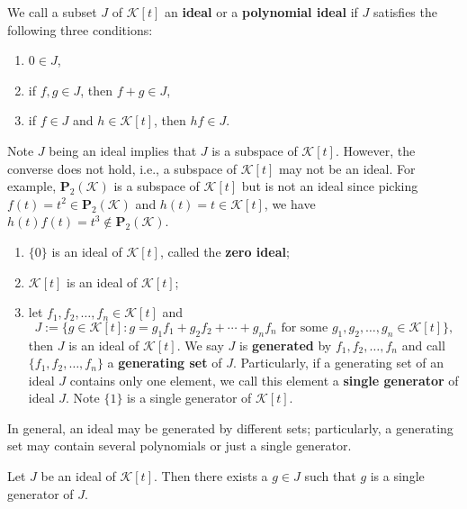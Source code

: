 \begin{definitionenv}
    We call a subset $J$ of $\mathcal K[t]$ an \textbf{ideal} or a \textbf{polynomial ideal} if $J$ satisfies the following three conditions:
    \begin{enumerate}[label=(\arabic*)]
        \item $0 \in J$,
        \item if $f,g \in J$, then $f+g \in J$,
        \item if $f\in J$ and $h\in \mathcal K[t]$, then $hf \in J$.
    \end{enumerate}
\end{definitionenv}
\begin{remarkenv}
    Note $J$ being an ideal implies that $J$ is a subspace of $\mathcal K[t]$. However, the converse does not hold, i.e., a subspace of $\mathcal K[t]$ may not be an ideal. For example, $\mathbf{P}_2(\mathcal K)$ is a subspace of $\mathcal K[t]$ but is not an ideal since picking $f(t) = t^2 \in \mathbf{P}_2(\mathcal K)$ and $h(t) = t \in \mathcal K[t]$, we have $h(t) f(t) = t^3 \notin \mathbf{P}_2(\mathcal K)$.
\end{remarkenv}
\begin{exampleenv}
    \begin{enumerate}[label=(\arabic*)]
        \item $\{ 0 \}$ is an ideal of $\mathcal K[t]$, called the \textbf{zero ideal};
        \item $\mathcal K[t]$ is an ideal of $\mathcal K[t]$;
        \item let $f_1, f_2, \ldots, f_n \in \mathcal K[t]$ and
        $$ J := \{ g \in \mathcal K[t] : g = g_1 f_1 + g_2 f_2 + \cdots + g_n f_n \text{ for some } g_1, g_2, \ldots, g_n \in \mathcal K[t] \}, $$
        then $J$ is an ideal of $\mathcal K[t]$. We say $J$ is \textbf{generated} by $f_1, f_2, \ldots, f_n$ and call $\{ f_1, f_2, \ldots, f_n \}$ a \textbf{generating set} of $J$. Particularly, if a generating set of an ideal $J$ contains only one element, we call this element a \textbf{single generator} of ideal $J$. Note $\{ 1 \}$ is a single generator of $\mathcal K[t]$.
    \end{enumerate}
\end{exampleenv}
\begin{remarkenv}
    In general, an ideal may be generated by different sets; particularly, a generating set may contain several polynomials or just a single generator.
\end{remarkenv}
\begin{theoremenv}\label{thm: single generator of ideal}
    Let $J$ be an ideal of $\mathcal K[t]$. Then there exists a $g\in J$ such that $g$ is a single generator of $J$.
\end{theoremenv}
